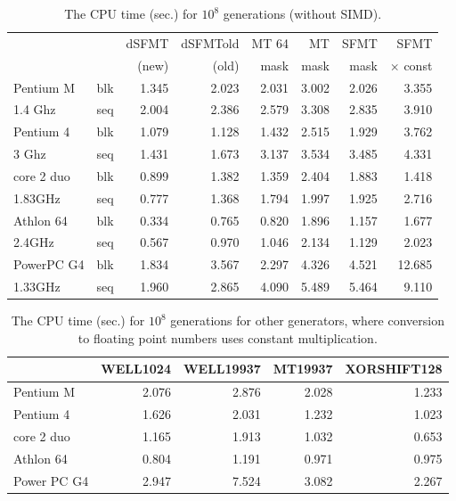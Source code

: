 \documentclass{svmult}
\begin{document}
\begin{table}
  \begin{center}
    \caption{The CPU time (sec.) for $10^8$ generations (without SIMD).}
    \label{tab:speed-c}
    \begin{tabular}{|ll|r|r|r|r|r|r|} \hline
      &  & dSFMT & dSFMTold & MT 64 & MT & SFMT & SFMT \\
      &  &(new)&(old)& mask & mask & mask & $\times$ const \\ \hline\hline
      Pentium M & blk & 1.345 & 2.023 & 2.031 & 3.002 & 2.026 & 3.355 \\
      1.4 Ghz & seq & 2.004 & 2.386 & 2.579 & 3.308 & 2.835 & 3.910 \\ \hline
      Pentium 4 & blk & 1.079 & 1.128 & 1.432 & 2.515 & 1.929 & 3.762 \\
      3 Ghz & seq & 1.431 & 1.673 & 3.137 & 3.534 & 3.485 & 4.331 \\ \hline
      core 2 duo & blk & 0.899 & 1.382 & 1.359 & 2.404 & 1.883 & 1.418 \\
      1.83GHz & seq & 0.777 & 1.368 & 1.794 & 1.997 & 1.925 & 2.716 \\ \hline
      Athlon 64 & blk & 0.334 & 0.765 & 0.820 & 1.896 & 1.157 & 1.677 \\
      2.4GHz & seq & 0.567 & 0.970 & 1.046 & 2.134 & 1.129 & 2.023 \\ \hline
      PowerPC G4 & blk & 1.834 & 3.567 & 2.297 & 4.326 & 4.521 & 12.685 \\
      1.33GHz & seq & 1.960 & 2.865 & 4.090 & 5.489 & 5.464 & 9.110 \\ \hline
    \end{tabular}
  \end{center}
\end{table}

\begin{table}
  \begin{center}
    \caption{The CPU time (sec.) for $10^8$ generations for other generators,
       where conversion to floating point numbers uses constant multiplication.}
    \label{tab:speed-other}
    \begin{tabular}{|l|r|r|r|r|} \hline
      & WELL1024 & WELL19937 & MT19937 & XORSHIFT128 \\ \hline
      Pentium M & 2.076 & 2.876 & 2.028 & 1.233 \\
      Pentium 4 & 1.626 & 2.031 & 1.232 & 1.023 \\
      core 2 duo & 1.165 & 1.913 & 1.032 & 0.653 \\
      Athlon 64 & 0.804 & 1.191 & 0.971 & 0.975 \\
      Power PC G4 & 2.947 & 7.524 & 3.082 & 2.267 \\ \hline
    \end{tabular}
  \end{center}
\end{table}
\end{document}

